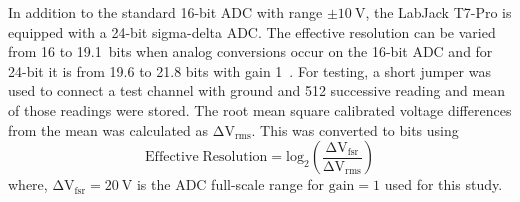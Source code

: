 In addition to the standard 16-bit ADC with range $\pm10~\mathrm{V}$, the LabJack T7-Pro is equipped with a 24-bit sigma-delta ADC. The effective resolution can be varied from 16 to 19.1~bits when analog conversions occur on the 16-bit ADC and for 24-bit it is from 19.6 to 21.8 bits with gain 1~\cite{T7}. For testing, a short jumper was used to connect a test channel with ground and 512 successive reading and mean of those readings were stored. The root mean square calibrated voltage differences from the mean was calculated as $\mathrm{\Delta V_{rms}}$. This was converted to bits using
\begin{equation}
    \mathrm{Effective\;Resolution=log_2\left(\frac{\Delta V_{fsr}}{\Delta V_{rms}}\right)}
\end{equation}
where, $\mathrm{\Delta V_{fsr}=20~V}$ is the ADC full-scale range for $\mathrm{gain=1}$ used for this study.







